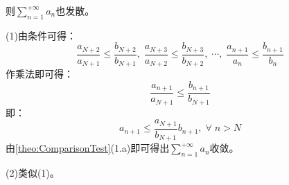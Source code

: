 \begin{note}
\begin{enumerate}
		则$\sum\limits_{n=1}^{+\infty}a_n$也发散。
	\end{enumerate}\par
	(1)由条件可得：
	\begin{equation*}
		\frac{a_{N+2}}{a_{N+1}}\leqslant\frac{b_{N+2}}{b_{N+1}},\;
		\frac{a_{N+3}}{a_{N+2}}\leqslant\frac{b_{N+3}}{b_{N+2}},\;
		\cdots,\;
		\frac{a_{n+1}}{a_n}\leqslant\frac{b_{n+1}}{b_n}
	\end{equation*}
	作乘法即可得：
	\begin{equation*}
		\frac{a_{n+1}}{a_{N+1}}\leqslant\frac{b_{n+1}}{b_{N+1}}
	\end{equation*}
	即：
	\begin{equation*}
		a_{n+1}\leqslant\frac{a_{N+1}}{b_{N+1}}b_{n+1},\;\forall\;n>N
	\end{equation*}
	由\cref{theo:ComparisonTest}(1.a)即可得出$\sum\limits_{n=1}^{+\infty}a_n$收敛。\par
	(2)类似(1)。
\end{note}
